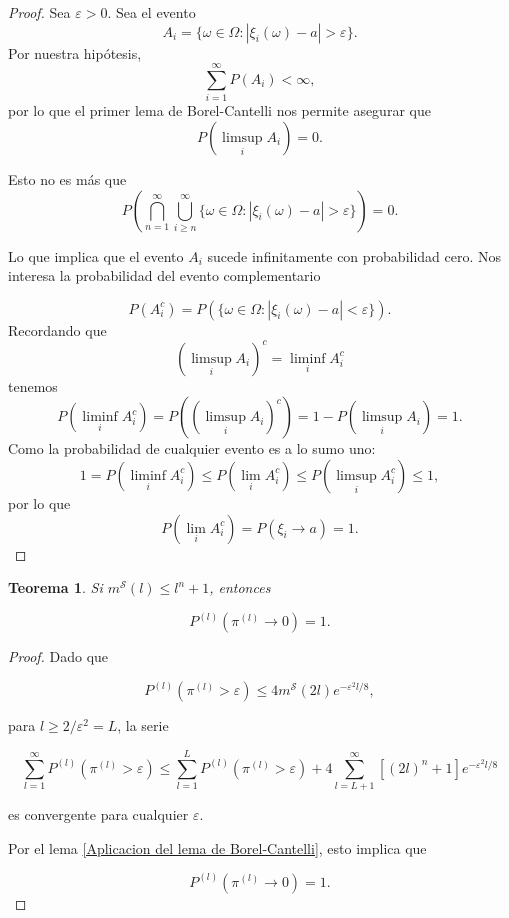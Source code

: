\documentclass{report}
\newtheorem{thm}{Teorema}[section]
\begin{document}
\begin{proof}
    Sea $\varepsilon > 0$. Sea el evento
    \[
        A_i = \{ \omega \in \Omega : |\xi_i(\omega)-a| > \varepsilon\}.
    \]
Por nuestra hipótesis,
\[
    \sum_{i=1}^{\infty}P(A_i) < \infty,
\]
por lo que el primer lema de Borel-Cantelli nos permite asegurar que
\[
    P\left( \limsup_i A_i \right) = 0.
\]

Esto no es más que
\[
P\left( \bigcap_{n=1}^{\infty} \bigcup_{i\geq n}^{\infty} \{ \omega \in \Omega : |\xi_i(\omega)-a| > \varepsilon\} \right) = 0.
\]

Lo que implica que el evento $A_i$ sucede infinitamente con probabilidad cero. Nos interesa la probabilidad del evento complementario

\[
P(A_i^c) = P(\{ \omega \in \Omega : |\xi_i(\omega)-a| < \varepsilon\}).
\]
Recordando que
\[
\left(\limsup_i A_i\right)^c = \liminf_i A_i^c
\]
tenemos
\[
P\left(\liminf_i A_i^c\right) = P\left(\left(\limsup_i A_i\right)^c\right) = 1 - P\left( \limsup_i A_i \right) = 1.
\]
Como la probabilidad de cualquier evento es a lo sumo uno:
\[
1 = P\left(\liminf_i A_i^c\right) \leq P\left(\lim_i A_i^c\right) \leq P\left( \limsup_i A_i^c \right) \leq 1,
\]
por lo que
\[
P\left(\lim_i A_i^c\right) = P(\xi_i \to a) = 1.
\]
\end{proof}

\begin{thm}
    Si \( m^{\mathcal{S}}(l) \leq l^n + 1 \), entonces

    \[
    P^{(l)}(\pi^{(l)} \to 0) = 1.
    \]

\end{thm}

\begin{proof}

Dado que

\[
P^{(l)}(\pi^{(l)} > \varepsilon) \leq 4 m^{\mathcal{S}}(2l)  e^{-\varepsilon^2 l/8},
\]

para \( l \geq 2 / \varepsilon^2 =L \), la serie

\[
\sum_{l=1}^{\infty} P^{(l)}(\pi^{(l)} > \varepsilon) \leq \sum_{l=1}^{L} P^{(l)}(\pi^{(l)} > \varepsilon) + 4 \sum_{l=L+1}^{\infty} [(2l)^n + 1] e^{-\varepsilon^2 l/8}
\]

es convergente para cualquier \( \varepsilon \).

Por el lema \ref{Aplicacion del lema de Borel-Cantelli}, esto implica que

\[
P^{(l)}(\pi^{(l)} \to 0) = 1.
\]
\end{proof}
\end{document}
